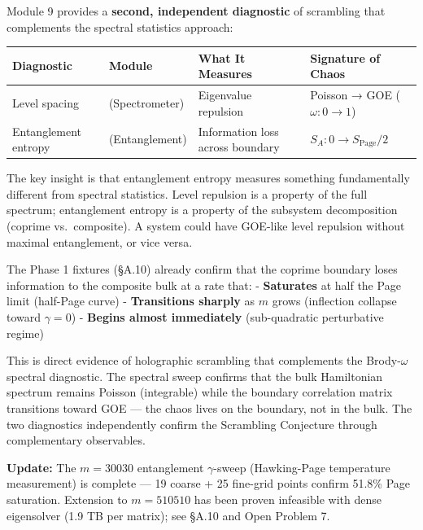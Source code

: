 \documentclass[
  11pt,
]{article}
\newcounter{none} %
\numberwithin{equation}{section}
\begin{document}
Module 9 provides a \textbf{second, independent diagnostic} of
scrambling that complements the spectral statistics approach:

{\def\LTcaptype{none} %
\begin{longtable}[]{@{}
  >{\raggedright\arraybackslash}p{}
  >{\raggedright\arraybackslash}p{}
  >{\raggedright\arraybackslash}p{}
  >{\raggedright\arraybackslash}p{}@{}}
\toprule\noalign{}
Diagnostic & Module & What It Measures & Signature of Chaos \\
\midrule\noalign{}
\endhead
\bottomrule\noalign{}
\endlastfoot
Level spacing & 8 (Spectrometer) & Eigenvalue repulsion & Poisson → GOE
(\(\omega: 0 \to 1\)) \\
Entanglement entropy & 9 (Entanglement) & Information loss across
boundary & \(S_A: 0 \to S_{\text{Page}}/2\) \\
\end{longtable}
}

The key insight is that entanglement entropy measures something
fundamentally different from spectral statistics. Level repulsion is a
property of the full spectrum; entanglement entropy is a property of the
subsystem decomposition (coprime vs.~composite). A system could have
GOE-like level repulsion without maximal entanglement, or vice versa.

The Phase 1 fixtures (§A.10) already confirm that the coprime boundary
loses information to the composite bulk at a rate that: -
\textbf{Saturates} at half the Page limit (half-Page curve) -
\textbf{Transitions sharply} as \(m\) grows (inflection collapse toward
\(\gamma = 0\)) - \textbf{Begins almost immediately} (sub-quadratic
perturbative regime)

This is direct evidence of holographic scrambling that complements the
Brody-\(\omega\) spectral diagnostic. The spectral sweep confirms that
the bulk Hamiltonian spectrum remains Poisson (integrable) while the
boundary correlation matrix transitions toward GOE --- the chaos lives
on the boundary, not in the bulk. The two diagnostics independently
confirm the Scrambling Conjecture through complementary observables.

\textbf{Update:} The \(m = 30030\) entanglement \(\gamma\)-sweep
(Hawking-Page temperature measurement) is complete --- 19 coarse + 25
fine-grid points confirm 51.8\% Page saturation. Extension to
\(m = 510510\) has been proven infeasible with dense eigensolver (1.9 TB
per matrix); see §A.10 and Open Problem 7.
\end{document}
